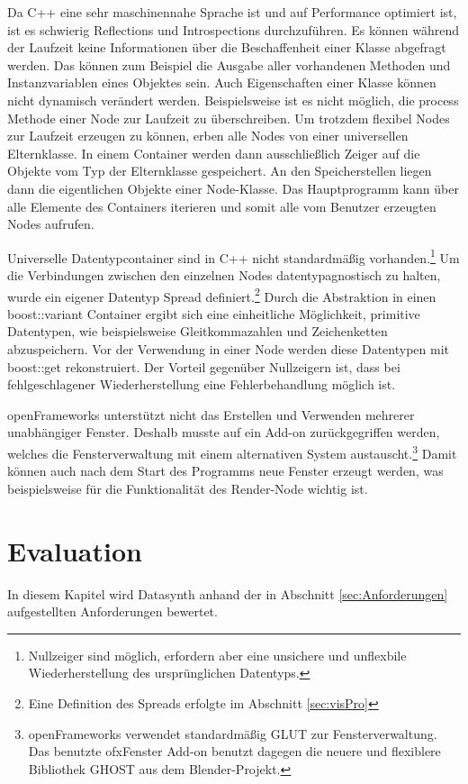 \documentclass[a4paper, 
               12pt,
               DIV=calc,
               version=first,
               pdftex,
               headsepline,
               footsepline,
               bibtotocnumbered,
               liststotocnumbered]{scrreprt}
\begin{document}
Da C++ eine sehr maschinennahe Sprache ist und auf Performance optimiert ist,
ist es schwierig Reflections und Introspections durchzuführen.
Es können während der Laufzeit keine Informationen
über die Beschaffenheit einer Klasse abgefragt werden.
Das können zum Beispiel die Ausgabe aller vorhandenen Methoden und Instanzvariablen eines Objektes sein.
Auch Eigenschaften einer Klasse können nicht dynamisch verändert werden. Beispielsweise
ist es nicht möglich, die process Methode einer Node zur Laufzeit zu überschreiben.
Um trotzdem flexibel Nodes zur Laufzeit erzeugen zu können, erben alle Nodes
von einer universellen Elternklasse. In einem Container werden dann ausschließlich Zeiger
auf die Objekte vom Typ der Elternklasse gespeichert. An den Speicherstellen
liegen dann die eigentlichen Objekte einer Node-Klasse. Das Hauptprogramm kann
über alle Elemente des Containers iterieren und somit alle vom Benutzer erzeugten
Nodes aufrufen.

Universelle Datentypcontainer sind in C++ nicht standardmäßig vorhanden.\footnote{Nullzeiger sind
möglich, erfordern aber eine unsichere und unflexbile Wiederherstellung des ursprünglichen Datentyps.} Um die Verbindungen
zwischen den einzelnen Nodes datentypagnostisch zu halten, wurde ein
eigener Datentyp Spread definiert.\footnote{Eine Definition des Spreads erfolgte im Abschnitt \ref{sec:visPro}}
Durch die Abstraktion in einen boost::variant Container ergibt sich eine einheitliche Möglichkeit, primitive Datentypen,
wie beispielsweise Gleitkommazahlen und Zeichenketten abzuspeichern. Vor der Verwendung in einer Node werden diese
Datentypen mit boost::get rekonstruiert. Der Vorteil gegenüber Nullzeigern ist, dass bei fehlgeschlagener
Wiederherstellung eine Fehlerbehandlung möglich ist.

openFrameworks unterstützt nicht das Erstellen und Verwenden mehrerer
unabhängiger Fenster. Deshalb musste
auf ein Add-on zurückgegriffen werden, welches die Fensterverwaltung
mit einem alternativen System austauscht.\footnote{openFrameworks verwendet standardmäßig GLUT
zur Fensterverwaltung. Das benutzte ofxFenster Add-on benutzt dagegen die neuere und
flexiblere Bibliothek GHOST aus dem Blender-Projekt.} Damit können auch nach dem Start des Programms
neue Fenster erzeugt werden, was beispielsweise für die Funktionalität des Render-Node wichtig ist.

\chapter{Evaluation}
\label{cha:Auswertung}
In diesem Kapitel wird Datasynth anhand der in Abschnitt \ref{sec:Anforderungen}
aufgestellten Anforderungen bewertet.
\end{document}
